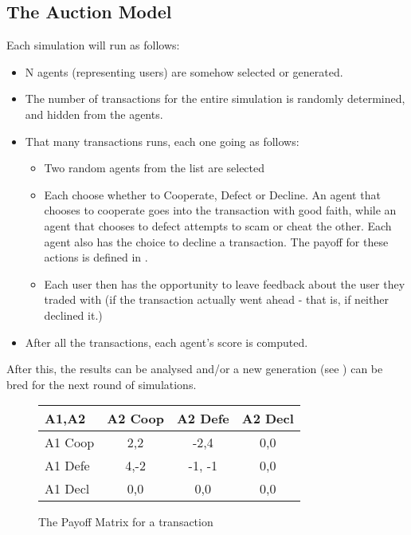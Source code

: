 \documentclass{article}
\begin{document}
\subsection{The Auction Model}
Each simulation will run as follows:
\begin{itemize}
	\item N agents (representing users) are somehow selected or generated.
	\item The number of transactions for the entire simulation is randomly determined, and hidden from the agents.
	\item That many transactions runs, each one going as follows:
	\begin{itemize}
		\item Two random agents from the list are selected
		\item Each choose whether to Cooperate, Defect or Decline. An agent that chooses to cooperate goes into the transaction with good faith, while an agent that chooses to defect attempts to scam or cheat the other. Each agent also has the choice to decline a transaction. The payoff for these actions is defined in .
		\item Each user then has the opportunity to leave feedback about the user they traded with (if the transaction actually went ahead - that is, if neither declined it.)
	\end{itemize}
	\item After all the transactions, each agent's score is computed.
\end{itemize}

After this, the results can be analysed and/or a new generation (see ) can be bred for the next round of simulations.
	\begin{figure}[h]
		\begin{center}
			\label{fig:model-payoff}
			\caption{The Payoff Matrix for a transaction}
			\begin{tabular}{| l || c | c | c |}
				\hline
				A1,A2 & A2 Coop & A2 Defe & A2 Decl \\ \hline
				A1 Coop & 2,2 & -2,4 & 0,0 \\ \hline  
				A1 Defe & 4,-2 & -1, -1 & 0,0 \\ \hline
				A1 Decl & 0,0 & 0,0 & 0,0 \\ \hline
			\end{tabular}
		\end{center}
	\end{figure}
\end{document}
